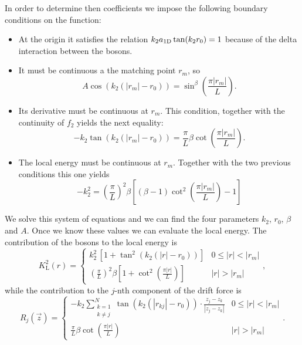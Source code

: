 In order to determine then coefficients we impose the following boundary
conditions on the function:
%
\begin{itemize}
  \item At the origin it satisfies the relation $k_2 a_{ \mathrm{1D} } \tan(k_2 r_0) =
          1$ because of the delta interaction between the bosons.

  \item It must be continuous a the matching point $r_m$, so
        \begin{equation}
          A \cos(k_2(|r_m| - r_0)) = \sin^{\beta}\left(\frac{\pi |r_m|}{L} \right).
        \end{equation}

  \item Its derivative must be continuous at $r_m$. This condition, together
        with the continuity of $f_2$ yields the next equality:
        \begin{equation}
          -k_2 \tan(k_2(|r_m| - r_0)) = \frac{\pi}{L} \beta \cot\left(\frac{\pi |r_m|}{L} \right).
        \end{equation}

  \item The local energy must be continuous at $r_m$. Together with the two
        previous conditions this one yields
        \begin{equation}
          -k_2^2 = \left(\frac{\pi}{L}\right)^2 \beta \left[ (\beta - 1) \cot^2\left(\frac{\pi |r_m|}{L} \right) -1 \right]
        \end{equation}
\end{itemize}
%
We solve this system of equations and we can find the four parameters $k_2$,
$r_0$, $\beta$ and $A$. Once we know these values we can evaluate the local
energy. The contribution of the bosons to the local energy is
%
\begin{equation}
  K_{\mathrm{L}}^2(r) = \begin{cases}
    k_2^2 \, [1 + \tan^2(k_2(|r| - r_0))]                                                       & 0 \leq |r| < |r_m| \\
    \left(\frac{\pi}{L}\right)^2 \beta \left[ 1 + \cot^2\left(\frac{\pi |r|}{L} \right) \right] & |r| > |r_m|
  \end{cases},
\end{equation}
%
while the contribution to the $j$-nth component of the drift force is
%
\begin{equation}
  R_{j}(\vec z) = \begin{cases}
    -k_2 \displaystyle \sum_{\substack{k=1                                  \\ k \neq j}}^{N} \tan(k_2(|r_{kj}| - r_0)) \cdot \frac{z_j - z_k}{|z_j - z_k|} & 0 \leq |r| < |r_m| \\
    \frac{\pi}{L} \beta \cot \left( \frac{\pi |r|}{L} \right) & |r| > |r_m|
  \end{cases}.
\end{equation}
